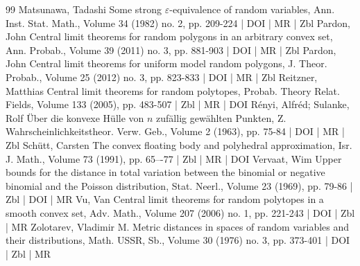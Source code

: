 \documentclass[10pt]{amsart}
\theoremstyle{definition}\newtheorem{defi}[theo]{Definition}\newtheorem{rema}[theo]{Remark}\newtheorem{exam}[theo]{Example}\newtheorem{exem}[theo]{Example}\newtheorem{nota}[theo]{Notation}
\begin{document}
\begin{thebibliography}{99}
 Matsunawa, Tadashi Some strong $\varepsilon $-equivalence of random variables, Ann. Inst. Stat. Math., Volume 34 (1982) no. 2, pp. 209-224 | DOI | MR | Zbl
 Pardon, John Central limit theorems for random polygons in an arbitrary convex set, Ann. Probab., Volume 39 (2011) no. 3, pp. 881-903 | DOI | MR | Zbl
 Pardon, John Central limit theorems for uniform model random polygons, J. Theor. Probab., Volume 25 (2012) no. 3, pp. 823-833 | DOI | MR | Zbl
 Reitzner, Matthias Central limit theorems for random polytopes, Probab. Theory Relat. Fields, Volume 133 (2005), pp. 483-507 | Zbl | MR | DOI
 Rényi, Alfréd; Sulanke, Rolf Über die konvexe Hülle von $n$ zufällig gewählten Punkten, Z. Wahrscheinlichkeitstheor. Verw. Geb., Volume 2 (1963), pp. 75-84 | DOI | MR | Zbl
 Schütt, Carsten The convex floating body and polyhedral approximation, Isr. J. Math., Volume 73 (1991), pp. 65–-77 | Zbl | MR | DOI
 Vervaat, Wim Upper bounds for the distance in total variation between the binomial or negative binomial and the Poisson distribution, Stat. Neerl., Volume 23 (1969), pp. 79-86 | Zbl | DOI | MR
 Vu, Van Central limit theorems for random polytopes in a smooth convex set, Adv. Math., Volume 207 (2006) no. 1, pp. 221-243 | DOI | Zbl | MR
 Zolotarev, Vladimir M. Metric distances in spaces of random variables and their distributions, Math. USSR, Sb., Volume 30 (1976) no. 3, pp. 373-401 | DOI | Zbl | MR
\end{thebibliography}
\end{document}
